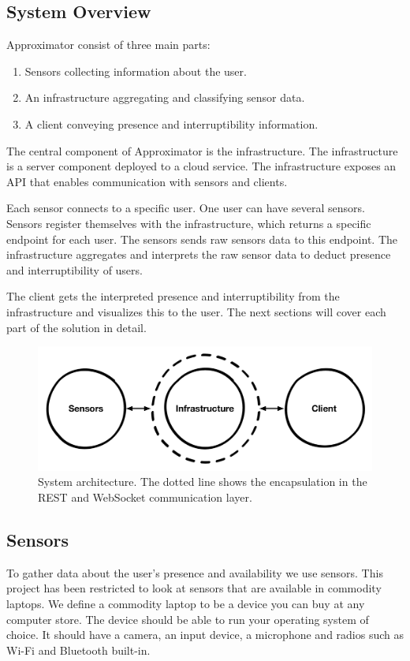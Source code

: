 \documentclass{sigchi}
\begin{document}
\subsection{System Overview}
Approximator consist of three main parts:
\begin{enumerate}%
  \item Sensors collecting information about the user.
  \item An infrastructure aggregating and classifying sensor data.
  \item A client conveying presence and interruptibility information.
\end{enumerate}

The central component of Approximator is the infrastructure.
The infrastructure is a server component deployed to a cloud service.
The infrastructure exposes an API that enables communication with sensors and clients.

Each sensor connects to a specific user.
One user can have several sensors.
Sensors register themselves with the infrastructure, which returns a specific endpoint for each user.
The sensors sends raw sensors data to this endpoint.
The infrastructure aggregates and interprets the raw sensor data to deduct presence and interruptibility of users.

The client gets the interpreted presence and interruptibility from the infrastructure and visualizes this to the user.
The next sections will cover each part of the solution in detail.

\begin{figure}[H]
  \centering
  \includegraphics[width=\columnwidth]{figures/system_architecture.pdf}
  \caption{System architecture. The dotted line shows the encapsulation in the REST and WebSocket communication layer.}
  \label{fig:architecture}
\end{figure}

\subsection{Sensors}
To gather data about the user's presence and availability we use sensors.
This project has been restricted to look at sensors that are available in commodity laptops.
We define a commodity laptop to be a device you can buy at any computer store.
The device should be able to run your operating system of choice.
It should have a camera, an input device, a microphone and radios such as Wi-Fi and Bluetooth built-in.
\end{document}
